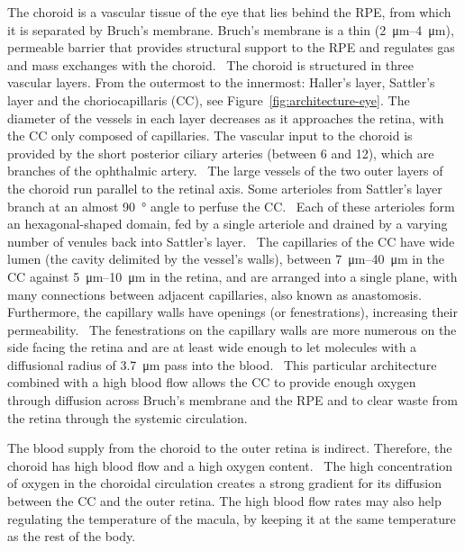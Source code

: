 \documentclass[12pt,a4paper]{journal}
\begin{document}
The choroid is a vascular tissue of the eye that lies behind the RPE, from which it is separated by Bruch's membrane.
Bruch's membrane is a thin (\SIrange{2}{4}{\micro\meter}), permeable barrier that provides structural support to the RPE and regulates gas and mass exchanges with the choroid.~\cite{Curcio_2013}
The choroid is structured in three vascular layers.
From the outermost to the innermost: Haller's layer, Sattler's layer and the choriocapillaris (CC), see Figure~\ref{fig:architecture-eye}.
The diameter of the vessels in each layer decreases as it approaches the retina, with the CC only composed of capillaries.
The vascular input to the choroid is provided by the short posterior ciliary arteries (between 6 and 12), which are branches of the ophthalmic artery.~\cite{Kiel_2010}
The large vessels of the two outer layers of the choroid run parallel to the retinal axis.
Some arterioles from Sattler's layer branch at an almost \SI{90}{\degree} angle to perfuse the CC.~\cite{Nickla_2010}
Each of these arterioles form an hexagonal-shaped domain, fed by a single arteriole and drained by a varying number of venules back into Sattler's layer.~\cite{Zouache_2016}
The capillaries of the CC have wide lumen (the cavity delimited by the vessel's walls), between \SIrange{7}{40}{\micro\meter} in the CC against \SIrange{5}{10}{\micro\meter} in the retina, and are arranged into a single plane, with many connections between adjacent capillaries, also known as anastomosis.~\cite{Bill_1983, ChanLing_2011,Fryczkowski_1994}
Furthermore, the capillary walls have openings (or fenestrations), increasing their permeability.~\cite{Nickla_2010}
The fenestrations on the capillary walls are more numerous on the side facing the retina and are at least wide enough to let molecules with a diffusional radius of \SI{3.7}{\micro\meter} pass into the blood.~\cite{Nickla_2010, Bill_1983}
This particular architecture combined with a high blood flow allows the CC to provide enough oxygen through diffusion across Bruch's membrane and the RPE and to clear waste from the retina through the systemic circulation.

The blood supply from the choroid to the outer retina is indirect.
Therefore, the choroid has high blood flow and a high oxygen content.~\cite{Bill_1983}
The high concentration of oxygen in the choroidal circulation creates a strong gradient for its diffusion between the CC and the outer retina.
The high blood flow rates may also help regulating the temperature of the macula, by keeping it at the same temperature as the rest of the body.~\cite{Bill_1983, Parver_1991}
\end{document}

